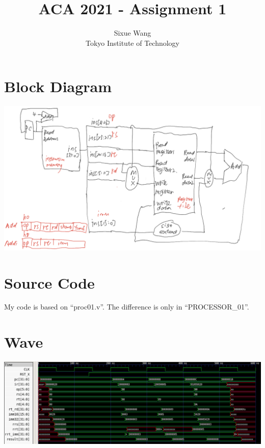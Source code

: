 \documentclass{article}
\title{ACA 2021 - Assignment 1}
\author{Sixue Wang\\Tokyo Institute of Technology}
\begin{document}
\maketitle

\section*{Block Diagram}
\includegraphics[width=\textwidth]{addi_diagram}

\section*{Source Code}
My code is based on ``proc01.v''. The difference is only in ``PROCESSOR\_01''.


\section*{Wave}
\includegraphics[width=\textwidth]{addi_wave}
\end{document}
